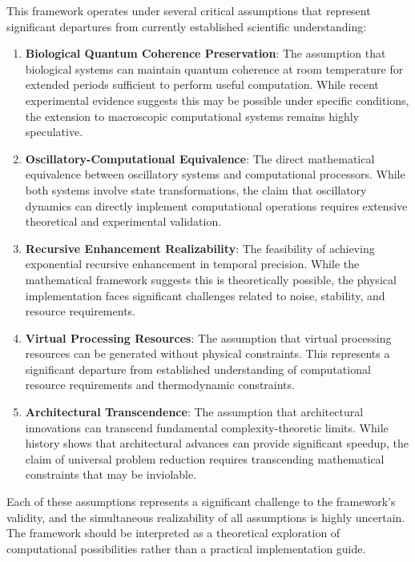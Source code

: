 \documentclass[12pt,a4paper]{article}
\theoremstyle{definition}
\begin{document}
This framework operates under several critical assumptions that represent significant departures from currently established scientific understanding:

\begin{enumerate}
\item \textbf{Biological Quantum Coherence Preservation}: The assumption that biological systems can maintain quantum coherence at room temperature for extended periods sufficient to perform useful computation. While recent experimental evidence suggests this may be possible under specific conditions, the extension to macroscopic computational systems remains highly speculative.

\item \textbf{Oscillatory-Computational Equivalence}: The direct mathematical equivalence between oscillatory systems and computational processors. While both systems involve state transformations, the claim that oscillatory dynamics can directly implement computational operations requires extensive theoretical and experimental validation.

\item \textbf{Recursive Enhancement Realizability}: The feasibility of achieving exponential recursive enhancement in temporal precision. While the mathematical framework suggests this is theoretically possible, the physical implementation faces significant challenges related to noise, stability, and resource requirements.

\item \textbf{Virtual Processing Resources}: The assumption that virtual processing resources can be generated without physical constraints. This represents a significant departure from established understanding of computational resource requirements and thermodynamic constraints.

\item \textbf{Architectural Transcendence}: The assumption that architectural innovations can transcend fundamental complexity-theoretic limits. While history shows that architectural advances can provide significant speedup, the claim of universal problem reduction requires transcending mathematical constraints that may be inviolable.
\end{enumerate}

Each of these assumptions represents a significant challenge to the framework's validity, and the simultaneous realizability of all assumptions is highly uncertain. The framework should be interpreted as a theoretical exploration of computational possibilities rather than a practical implementation guide.
\end{document}
